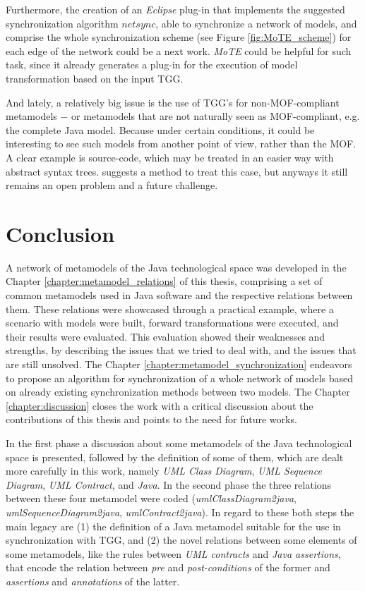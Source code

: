\documentclass[tuberlin,cic,tc,english,noabntcite]{iiufrgs}
\begin{document}
Furthermore, the creation of an \emph{Eclipse} plug-in that implements the suggested synchronization algorithm $netsync$, able to synchronize a network of models, and comprise the whole synchronization scheme (see Figure \ref{fig:MoTE_scheme}) for each edge of the network could be a next work. \emph{MoTE} could be helpful for such task, since it already generates a plug-in for the execution of model transformation based on the input TGG.

And lately, a relatively big issue is the use of TGG's for non-MOF-compliant metamodels $-$ or metamodels that are not naturally seen as MOF-compliant, e.g. the complete Java model. Because under certain conditions, it could be interesting to see such models from another point of view, rather than the MOF. A clear example is source-code, which may be treated in an easier way with abstract syntax trees. \citet{angyal2008novel} suggests a method to treat this case, but anyways it still remains an open problem and a future challenge.

\chapter{Conclusion}
A network of metamodels of the Java technological space was developed in the Chapter \ref{chapter:metamodel_relations} of this thesis, comprising a set of common metamodels used in Java software and the respective relations between them. These relations were showcased through a practical example, where a scenario with models were built, forward transformations were executed, and their results were evaluated. This evaluation showed their weaknesses and strengths, by describing the issues that we tried to deal with, and the issues that are still unsolved. The Chapter \ref{chapter:metamodel_synchronization} endeavors to propose an algorithm for synchronization of a whole network of models based on already existing synchronization methods between two models. The Chapter \ref{chapter:discussion} closes the work with a critical discussion about the contributions of this thesis and points to the need for future works.

In the first phase a discussion about some metamodels of the Java technological space is presented, followed by the definition of some of them, which are dealt more carefully in this work, namely \emph{UML Class Diagram}, \emph{UML Sequence Diagram}, \emph{UML Contract}, and \emph{Java}. In the second phase the three relations between these four metamodel were coded (\emph{umlClassDiagram2java}, \emph{umlSequenceDiagram2java}, \emph{umlContract2java}). In regard to these both steps the main legacy are (1) the definition of a Java metamodel suitable for the use in synchronization with TGG, and (2) the novel relations between some elements of some metamodels, like the rules between \emph{UML contracts} and \emph{Java assertions}, that encode the relation between \emph{pre} and \emph{post-conditions} of the former and \emph{assertions} and \emph{annotations} of the latter.
\end{document}
